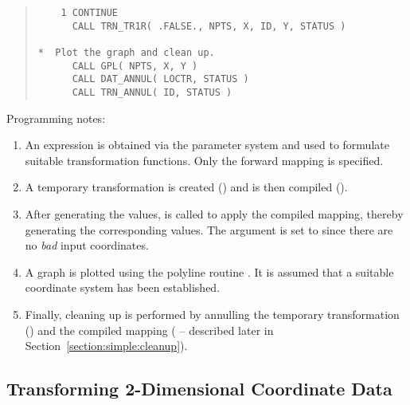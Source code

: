 \begin{quote}
\begin{tabbing}
\verb#    1 CONTINUE                                         #\\
\verb#      CALL TRN_TR1R( .FALSE., NPTS, X, ID, Y, STATUS ) #\\
\verb#                                                       #\\
\verb#*  Plot the graph and clean up.                        #\\
\verb#      CALL GPL( NPTS, X, Y )                           #\\
\verb#      CALL DAT_ANNUL( LOCTR, STATUS )                  #\\
\verb#      CALL TRN_ANNUL( ID, STATUS )                     #

\end{tabbing}
\end{quote}

Programming notes:

\begin{enumerate}

\item An expression is obtained via the parameter system and used to
formulate suitable transformation functions.
Only the forward mapping is specified.

\item A temporary transformation is created () and is then
compiled (). 

\item After generating the  values,  is called to
apply the compiled mapping, thereby generating the corresponding 
values. 
The  argument is set to  since there are no {\em
bad} input coordinates. 

\item A graph is plotted using the  polyline routine .
It is assumed that a suitable coordinate system has been established. 

\item Finally, cleaning up is performed by annulling the temporary
transformation () and the compiled mapping
( -- described later in
Section~\ref{section:simple:cleanup}). 

\end{enumerate}
\exampledone


\subsection{Transforming 2-Dimensional Coordinate Data}

